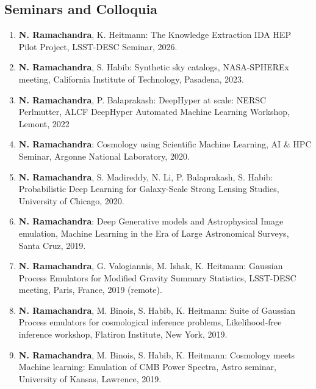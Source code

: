 \documentclass[letterpaper]{article}
\begin{document}
\subsection*{Seminars and Colloquia}


\begin{enumerate}

\item \textbf{N. Ramachandra}, K. Heitmann: The Knowledge Extraction IDA HEP Pilot Project, LSST-DESC Seminar, 2026.

\item \textbf{N. Ramachandra}, S. Habib: Synthetic sky catalogs, NASA-SPHEREx meeting, California Institute of Technology, Pasadena, 2023.


\item \textbf{N. Ramachandra}, P. Balaprakash: DeepHyper at scale: NERSC Perlmutter, ALCF DeepHyper Automated Machine Learning Workshop, Lemont, 2022


\item \textbf{N. Ramachandra}: Cosmology using Scientific Machine Learning, AI \& HPC Seminar, Argonne National Laboratory, 2020.

\item \textbf{N. Ramachandra}, S. Madireddy, N. Li, P. Balaprakash, S. Habib: Probabilistic Deep Learning for Galaxy-Scale Strong Lensing Studies, University of Chicago, 2020.



\item \textbf{N. Ramachandra}: Deep Generative models and Astrophysical Image emulation, Machine Learning in the Era of Large Astronomical Surveys, Santa Cruz, 2019.

\item \textbf{N. Ramachandra}, G. Valogiannis, M. Ishak, K. Heitmann: Gaussian Process Emulators for Modified Gravity Summary Statistics, LSST-DESC meeting, Paris, France, 2019 (remote).

\item \textbf{N. Ramachandra}, M. Binois, S. Habib, K. Heitmann: Suite of Gaussian Process emulators for cosmological inference problems, Likelihood-free inference workshop, Flatiron Institute, New York, 2019.

\item \textbf{N. Ramachandra}, M. Binois, S. Habib, K. Heitmann: Cosmology meets Machine learning: Emulation of CMB Power Spectra, Astro seminar, University of Kansas, Lawrence, 2019.


\end{enumerate}
\end{document}
